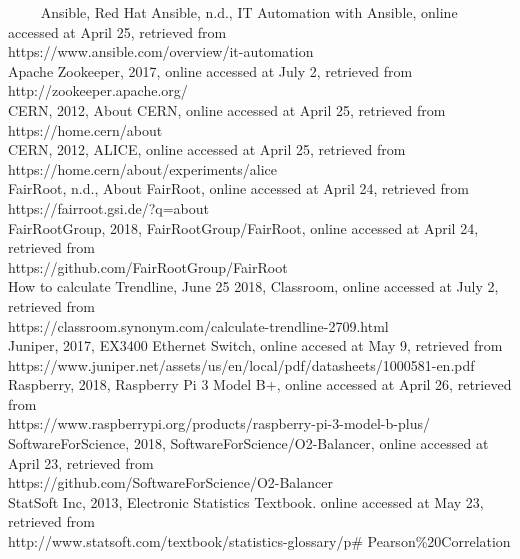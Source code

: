 ~~~~ Ansible, Red Hat Ansible, n.d., IT Automation with Ansible, online accessed at April 25, retrieved from \\https://www.ansible.com/overview/it-automation\\

Apache Zookeeper, 2017, online accessed at July 2, retrieved from \\http://zookeeper.apache.org/\\

CERN, 2012, About CERN, online accessed at April 25, retrieved from \\https://home.cern/about\\

CERN, 2012, ALICE, online accessed at April 25, retrieved from \\https://home.cern/about/experiments/alice\\

FairRoot, n.d., About FairRoot, online accessed at April 24, retrieved from \\https://fairroot.gsi.de/?q=about\\

FairRootGroup, 2018, FairRootGroup/FairRoot, online accessed at April 24, retrieved from \\https://github.com/FairRootGroup/FairRoot\\

How to calculate Trendline, June 25 2018, Classroom, online accessed at July 2, retrieved from \\https://classroom.synonym.com/calculate-trendline-2709.html\\

Juniper, 2017, EX3400 Ethernet Switch, online accesed at May 9, retrieved from \\https://www.juniper.net/assets/us/en/local/pdf/datasheets/1000581-en.pdf\\

Raspberry, 2018, Raspberry Pi 3 Model B+, online accessed at April 26, retrieved from \\https://www.raspberrypi.org/products/raspberry-pi-3-model-b-plus/\\

SoftwareForScience, 2018, SoftwareForScience/O2-Balancer, online accessed at April 23, retrieved from \\https://github.com/SoftwareForScience/O2-Balancer\\

StatSoft Inc, 2013, Electronic Statistics Textbook. online accessed at May 23, retrieved from  \\http://www.statsoft.com/textbook/statistics-glossary/p\# Pearson\%20Correlation\\

